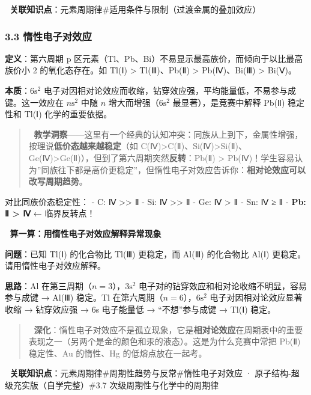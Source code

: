 \documentclass[a4paper,11pt]{ctexart}
\begin{document}
🔗 \textbf{关联知识点}：元素周期律\#适用条件与限制（过渡金属的叠加效应）

\subsubsection{3.3 惰性电子对效应}\label{ux60f0ux6027ux7535ux5b50ux5bf9ux6548ux5e94}

\textbf{定义}：第六周期 p 区元素（Tl、Pb、Bi）不易显示最高族价，而倾向于以比最高族价小 2 的氧化态存在。如 Tl(Ⅰ) \textgreater{} Tl(Ⅲ)、Pb(Ⅱ) \textgreater{} Pb(Ⅳ)、Bi(Ⅲ) \textgreater{} Bi(Ⅴ)。

\textbf{本质}：\(6\mathrm{s}^2\) 电子对因相对论效应而收缩，钻穿效应强，平均能量低，不易参与成键。这一效应在 \(n\mathrm{s}^2\) 中随 \(n\) 增大而增强（\(6\mathrm{s}^2\) 最显著），是竞赛中解释 Pb(Ⅱ) 稳定性和 Tl(Ⅰ) 化学的重要依据。

\begin{quote}
🧠 \textbf{教学洞察}------这里有一个经典的认知冲突：同族从上到下，金属性增强，按理说\textbf{低价态越来越稳定}（如 C(Ⅳ)\textgreater C(Ⅱ)、Si(Ⅳ)\textgreater Si(Ⅱ)、Ge(Ⅳ)\textgreater Ge(Ⅱ)），但到了第六周期突然\textbf{反转}：Pb(Ⅱ) \textgreater{} Pb(Ⅳ)！学生容易认为''同族往下都是高价更稳定''，但惰性电子对效应告诉你：\textbf{相对论效应可以改写周期趋势}。
\end{quote}

对比同族价态稳定性：
- C: Ⅳ \textgreater\textgreater{} Ⅱ
- Si: Ⅳ \textgreater\textgreater{} Ⅱ
- Ge: Ⅳ \textgreater{} Ⅱ
- Sn: Ⅳ ≥ Ⅱ
- \textbf{Pb: Ⅱ \textgreater{} Ⅳ} ← 临界反转点！

📝 \textbf{算一算：用惰性电子对效应解释异常现象}

\textbf{问题}：已知 Tl(Ⅰ) 的化合物比 Tl(Ⅲ) 更稳定，而 Al(Ⅲ) 的化合物比 Al(Ⅰ) 更稳定。请用惰性电子对效应解释。

\textbf{思路}：Al 在第三周期（\(n=3\)），\(3\mathrm{s}^2\) 电子对的钻穿效应和相对论收缩不明显，容易参与成键 → Al(Ⅲ) 稳定。Tl 在第六周期（\(n=6\)），\(6\mathrm{s}^2\) 电子对因相对论效应显著收缩 → 钻穿效应强 → 6s 电子能量低 → ``不想''参与成键 → Tl(Ⅰ) 稳定。

\begin{quote}
🧠 \textbf{深化}：惰性电子对效应不是孤立现象，它是\textbf{相对论效应}在周期表中的重要表现之一（另两个是金的颜色和汞的液态）。这是为什么竞赛中常把 Pb(Ⅱ) 稳定性、Au 的惰性、Hg 的低熔点放在一起考。
\end{quote}

🔗 \textbf{关联知识点}：元素周期律\#周期性趋势与反常\#惰性电子对效应 · 原子结构-超级充实版（自学完整）\#3.7 次级周期性与化学中的周期律
\end{document}
